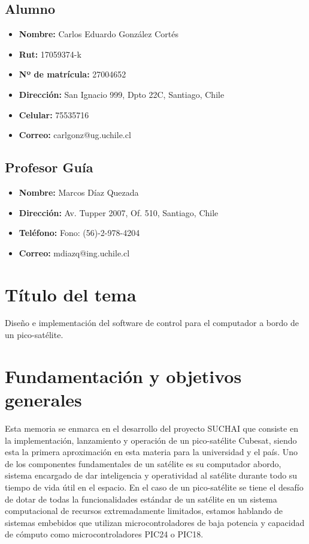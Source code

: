 \documentclass[11pt,letterpaper]{article}
\begin{document}
\subsection{Alumno}

\begin{itemize}
	\item \textbf{Nombre:} Carlos Eduardo González Cortés
	\item \textbf{Rut:} 17059374-k
	\item \textbf{Nº de matrícula:} 27004652
	\item \textbf{Dirección:} San Ignacio 999, Dpto 22C, Santiago, Chile
	\item \textbf{Celular:} 75535716
	\item \textbf{Correo:} carlgonz@ug.uchile.cl
\end{itemize}

\subsection{Profesor Guía}

\begin{itemize}
	\item \textbf{Nombre:} Marcos Díaz Quezada
	\item \textbf{Dirección:} Av. Tupper 2007, Of. 510, Santiago, Chile
	\item \textbf{Teléfono:} Fono: (56)-2-978-4204
	\item \textbf{Correo:} mdiazq@ing.uchile.cl
\end{itemize}

\newpage
\section{Título del tema}

Diseño e implementación del software de control para el computador a bordo de un pico-satélite.

\section{Fundamentación y objetivos generales}

Esta memoria se enmarca en el desarrollo del proyecto SUCHAI que consiste en la implementación, lanzamiento y operación de un pico-satélite Cubesat, siendo esta la primera aproximación en esta materia para la universidad y el país. Uno de los componentes fundamentales de un satélite es su computador abordo, sistema encargado de dar inteligencia y operatividad al satélite durante todo su tiempo de vida útil en el espacio. En el caso de un pico-satélite se tiene el desafío de dotar de todas la funcionalidades estándar de un satélite en un sistema computacional de recursos extremadamente limitados, estamos hablando de sistemas embebidos que utilizan microcontroladores de baja potencia y capacidad de cómputo como microcontroladores PIC24 o PIC18.
\end{document}

